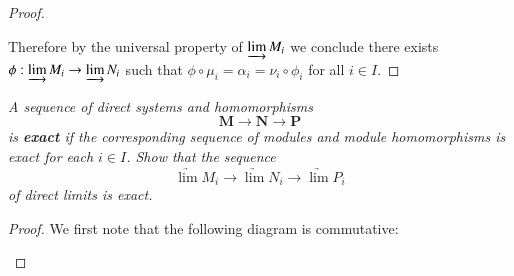 \begin{proof}
\begin{center}
\begin{tikzpicture}[x=0.75pt,y=0.75pt,yscale=-1,xscale=1]
\end{tikzpicture}
\end{center}
Therefore by the universal property of $\varinjlim M_i$ we conclude there exists $\phi:\varinjlim M_i\to\varinjlim N_i$ such that $\phi\circ\mu_i=\alpha_i=\nu_i\circ\phi_i$ for all $i\in I$.
\end{proof}
\begin{problem}\em
A sequence of direct systems and homomorphisms 
$$
\mathbf{M}\longrightarrow \mathbf{N}\longrightarrow \mathbf{P}
$$
is \textbf{exact} if the corresponding sequence of modules and module homomorphisms is exact for each $i\in I$. Show that the sequence 
$$
\underrightarrow{\lim }M_i\longrightarrow \underrightarrow{\lim }N_i\longrightarrow \underrightarrow{\lim }P_i
$$
of direct limits is exact.
\end{problem}
\begin{proof}
We first note that the following diagram is commutative: 
\begin{center}



\begin{tikzpicture}[x=0.75pt,y=0.75pt,yscale=-1,xscale=1]


\end{tikzpicture}
\end{center}
\end{proof}

